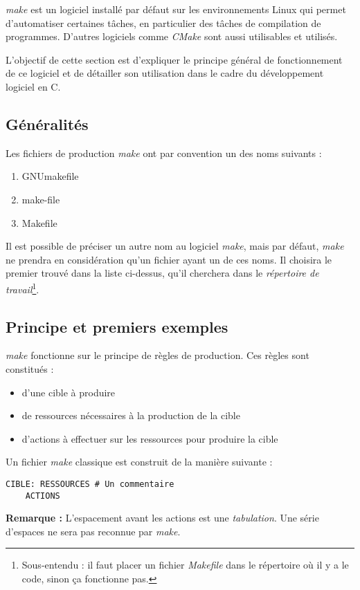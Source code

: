 \documentclass[../../../main.tex]{subfiles}
\begin{document}
\textit{make} est un logiciel installé par défaut sur les environnements Linux qui permet d'automatiser certaines tâches, en particulier des tâches de compilation de programmes. D'autres logiciels comme \textit{CMake} sont aussi utilisables et utilisés.

L'objectif de cette section est d'expliquer le principe général de fonctionnement de ce logiciel et de détailler son utilisation dans le cadre du développement logiciel en C.
\subsection{Généralités}
Les fichiers de production \textit{make} ont par convention un des noms suivants :
\begin{enumerate}
	\item GNUmakefile
	\item make-file
	\item Makefile
\end{enumerate}
Il est possible de préciser un autre nom au logiciel \textit{make}, mais par défaut, \textit{make} ne prendra en considération qu'un fichier ayant un de ces noms. Il choisira le premier trouvé dans la liste ci-dessus, qu'il cherchera dans le \textit{répertoire de travail}\footnote{Sous-entendu : il faut placer un fichier \textit{Makefile} dans le répertoire où il y a le code, sinon ça fonctionne pas.}.
\subsection{Principe et premiers exemples}
\textit{make} fonctionne sur le principe de règles de production. Ces règles sont constitués :
\begin{itemize}
	\item d'une cible à produire
	\item de ressources nécessaires à la production de la cible
	\item d'actions à effectuer sur les ressources pour produire la cible
\end{itemize}
Un fichier \textit{make} classique est construit de la manière suivante :
\begin{verbatim}
CIBLE: RESSOURCES # Un commentaire
	ACTIONS
\end{verbatim}
\textbf{Remarque :} L'espacement avant les actions est une \textit{tabulation}. Une série d'espaces ne sera pas reconnue par \textit{make}.
 
\end{document}
